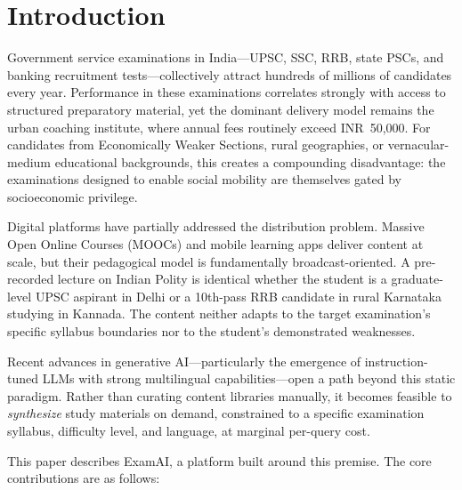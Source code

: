 \documentclass[conference]{IEEEtran}
\begin{document}
\section{Introduction}

Government service examinations in India---UPSC, SSC, RRB, state PSCs, and banking recruitment tests---collectively attract hundreds of millions of candidates every year. Performance in these examinations correlates strongly with access to structured preparatory material, yet the dominant delivery model remains the urban coaching institute, where annual fees routinely exceed INR~50,000. For candidates from Economically Weaker Sections, rural geographies, or vernacular-medium educational backgrounds, this creates a compounding disadvantage: the examinations designed to enable social mobility are themselves gated by socioeconomic privilege.

Digital platforms have partially addressed the distribution problem. Massive Open Online Courses (MOOCs) and mobile learning apps deliver content at scale, but their pedagogical model is fundamentally broadcast-oriented. A pre-recorded lecture on Indian Polity is identical whether the student is a graduate-level UPSC aspirant in Delhi or a 10th-pass RRB candidate in rural Karnataka studying in Kannada. The content neither adapts to the target examination's specific syllabus boundaries nor to the student's demonstrated weaknesses.

Recent advances in generative AI---particularly the emergence of instruction-tuned LLMs with strong multilingual capabilities---open a path beyond this static paradigm. Rather than curating content libraries manually, it becomes feasible to \textit{synthesize} study materials on demand, constrained to a specific examination syllabus, difficulty level, and language, at marginal per-query cost.

This paper describes ExamAI, a platform built around this premise. The core contributions are as follows:
\end{document}
